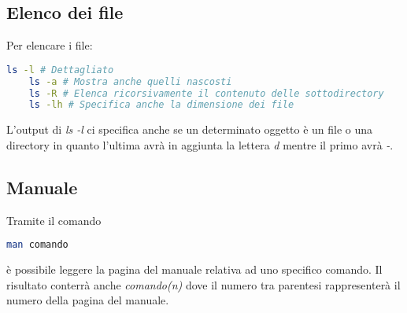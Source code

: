 \subsection{Elenco dei file}
Per elencare i file:
\begin{lstlisting}[language=BASH]
	ls -l # Dettagliato
	ls -a # Mostra anche quelli nascosti
	ls -R # Elenca ricorsivamente il contenuto delle sottodirectory
	ls -lh # Specifica anche la dimensione dei file
\end{lstlisting}
L'output di \textit{ls -l} ci specifica anche se un determinato oggetto è un file o una directory in quanto l'ultima avrà in aggiunta la lettera \textit{d} mentre il primo avrà \textit{-}.

\subsection{Manuale}
Tramite il comando
\begin{lstlisting}[language=BASH]
	man comando
\end{lstlisting}
è possibile leggere la pagina del manuale relativa ad uno specifico comando. Il risultato conterrà anche \textit{comando(n)} dove il numero tra parentesi rappresenterà il numero della pagina del manuale.